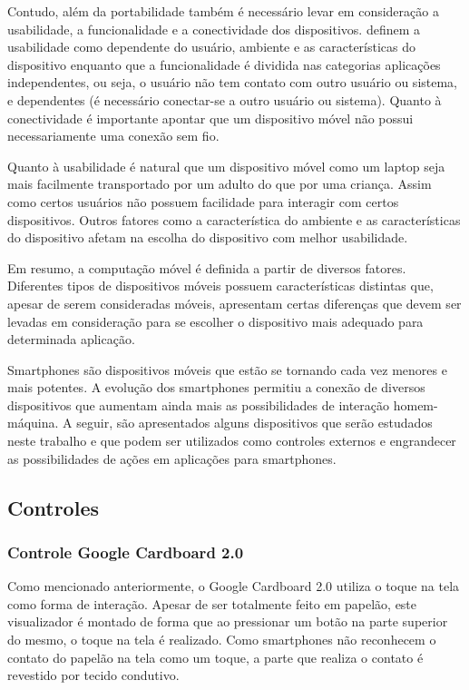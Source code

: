 Contudo, além da portabilidade também é necessário levar em consideração a usabilidade, a funcionalidade e a conectividade dos dispositivos.  definem a usabilidade como dependente do usuário, ambiente e as características do dispositivo enquanto que a funcionalidade é dividida nas categorias aplicações independentes, ou seja, o usuário não tem contato com outro usuário ou sistema, e dependentes (é necessário conectar-se a outro usuário ou sistema). Quanto à conectividade é importante apontar que um dispositivo móvel não possui necessariamente uma conexão sem fio.

Quanto à usabilidade é natural que um dispositivo móvel como um laptop seja mais facilmente transportado por um adulto do que por uma criança. Assim como certos usuários não possuem facilidade para interagir com certos dispositivos. Outros fatores como a característica do ambiente e as características do dispositivo afetam na escolha do dispositivo com melhor usabilidade. 

Em resumo, a computação móvel é definida a partir de diversos fatores. Diferentes tipos de dispositivos móveis possuem características distintas que, apesar de serem consideradas móveis, apresentam certas diferenças que devem ser levadas em consideração para se escolher o dispositivo mais adequado para determinada aplicação.

Smartphones são dispositivos móveis que estão se tornando cada vez menores e mais potentes. A evolução dos smartphones permitiu a conexão de diversos dispositivos que aumentam ainda mais as possibilidades de interação homem-máquina. A seguir, são apresentados alguns dispositivos que serão estudados neste trabalho e que podem ser utilizados como controles externos e engrandecer as possibilidades de ações em aplicações para smartphones. 

\subsection{Controles}

\subsubsection{Controle Google Cardboard 2.0}
\label{ss.cardboard}

Como mencionado anteriormente, o Google Cardboard 2.0 utiliza o toque na tela como forma de interação. Apesar de ser totalmente feito em papelão, este visualizador é montado de forma que ao pressionar um botão na parte superior do mesmo, o toque na tela é realizado. Como smartphones não reconhecem o contato do papelão na tela como um toque, a parte que realiza o contato é revestido por tecido condutivo.

